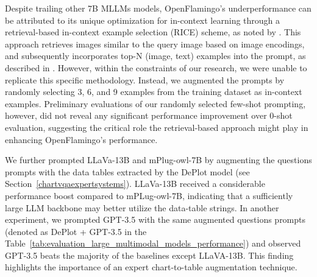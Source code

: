 \documentclass{article}
\begin{document}

Despite trailing other 7B MLLMs models, OpenFlamingo's underperformance can be attributed to its unique optimization for in-context learning through a retrieval-based in-context example selection (RICE) scheme, as noted by \cite{yang2022empirical}. This approach retrieves images similar to the query image based on image encodings, and subsequently incorporates top-N (image, text) examples into the prompt, as described in \cite{alayrac2022flamingo}. However, within the constraints of our research, we were unable to replicate this specific methodology. Instead, we augmented the prompts by randomly selecting 3, 6, and 9 examples from the training dataset as in-context examples. Preliminary evaluations of our randomly selected few-shot prompting, however, did not reveal any significant performance improvement over 0-shot evaluation, suggesting the critical role the retrieval-based approach might play in enhancing OpenFlamingo's performance.

We further prompted LLaVa-13B and mPlug-owl-7B by augmenting the questions prompts with the data tables extracted by the DePlot model (see Section~\ref{chartvqaexpertsystems}). LLaVa-13B received a considerable performance boost compared to mPLug-owl-7B, indicating that a sufficiently large LLM backbone may better utilize the data-table strings. In another experiment, we prompted GPT-3.5 with the same augmented questions prompts (denoted as DePlot + GPT-3.5 in the Table~\ref{tab:evaluation_large_multimodal_models_performance}) and observed GPT-3.5 beats the majority of the baselines except LLaVA-13B. This finding highlights the importance of an expert chart-to-table augmentation technique.

\end{document}

